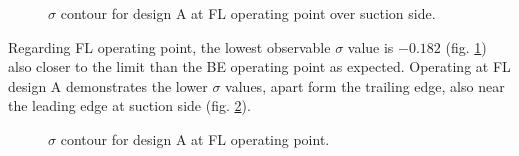 \begin{figure}[h!]
\begin{minipage}[b]{1\linewidth}
 \centering
\end{minipage}
\caption{$\sigma$ contour for design A at FL operating point over suction side.}
\label{Francis-A-FL}
\end{figure}

Regarding FL operating point, the lowest observable $\sigma$ value is $-0.182$ (fig. \ref{Francis-A-FL}) also closer to the limit than the BE operating point as expected. Operating at FL design A demonstrates the lower $\sigma$ values, apart form the trailing edge, also near the leading edge at suction side (fig. \ref{Francis-A-SS}). 


\begin{figure}[h!]
\begin{minipage}[b]{1\linewidth}
 \centering
\end{minipage}
\caption{$\sigma$ contour for design A at FL operating point.}
\label{Francis-A-SS}
\end{figure}

